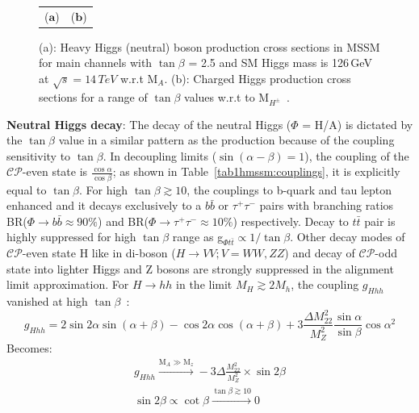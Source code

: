 \begin{figure}[htp]
\begin{tabular}{cc}
  \qquad\qquad\qquad\qquad ($\mathbf{a}$)\qquad\qquad\qquad&($\mathbf{b}$)\\
\end{tabular}
\caption{(a): Heavy Higgs (neutral) boson production cross sections in MSSM for main channels with $\tan\beta$ = 2.5 and SM Higgs mass is 126\,GeV at $\sqrt{s} = 14\,TeV$ w.r.t M$_{A}$. (b): Charged Higgs production cross sections for a range of $\tan\beta$ values w.r.t to M$_{H^{\pm}}$~\cite{Djouadi:2013vqa,Djouadi:2015jea}. }\label{fig:Heavy_H_prod_xsec}
\end{figure}
\noindent\textbf{Neutral Higgs decay}: The decay of the neutral Higgs ($\Phi$ = H/A) is dictated by the $\tan\beta$ value in a similar pattern as the production because of the coupling sensitivity to $\tan\beta$. In decoupling limits ($\sin\left(\alpha-\beta\right) = 1$), the coupling of the $\mathcal{CP}$-even state is $\frac{\cos\alpha}{\cos\beta}$; as shown in Table~\ref{tab1hmssm:couplings}, it is explicitly equal to $\tan\beta$. For high $\tan\beta \gtrsim 10$, the couplings to b-quark and tau lepton enhanced and it decays exclusively to a $b\bar{b}$ or $\tau^{+}\tau^{-}$ pairs with branching ratios BR($\Phi\rightarrow b\bar{b} \approx 90\%$) and BR($\Phi\rightarrow \tau^{+}\tau^{-} \approx 10\%$) respectively. Decay to $t\bar{t}$ pair is highly suppressed for high $\tan\beta$ range as g$_{\Phi t\bar{t}} \propto 1/\tan\beta$. Other decay modes of $\mathcal{CP}$-even state H like in di-boson ($H\rightarrow VV; V= WW, ZZ$) and decay of $\mathcal{CP}$-odd state into lighter Higgs and Z bosons are strongly suppressed in the alignment limit approximation. For $H\rightarrow hh$ in the limit $M_{H}\gtrsim 2M_{h}$, the coupling $g_{Hhh}$ vanished at high $\tan\beta$~\cite{Baglio:2015wcg}: 
\begin{equation}
g_{Hhh} = 2\sin2\alpha \sin\left(\alpha+\beta\right)-\cos2\alpha\cos\left(\alpha+\beta\right)+3\frac{\Delta M^{2}_{22}}{M^{2}_{Z}}\frac{\sin\alpha}{\sin\beta}\cos\alpha^{2}
\end{equation}
Becomes:
\begin{equation}
\begin{split}
g_{Hhh} \xrightarrow{\text{M}_{A}\gg \text{M}_{z}} -3\Delta \frac{M^{2}_{22}}{M_{Z}^{2}}\times \sin2\beta\\
\sin2\beta \propto \cot\beta \xrightarrow{\tan\beta \gtrsim 10} 0
\end{split} 
\end{equation}  
